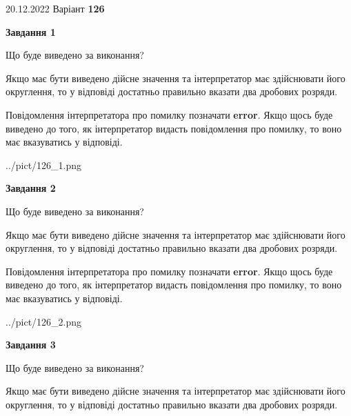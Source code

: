 \documentclass[12pt, ukrainian]{article}
\begin{document}
{20.12.2022 Варіант \No \textbf { 126 }\par}
{
\begin {Large}

{\begin {center}\textbf{Завдання 1}\end {center}}\par
Що буде виведено за виконання? \par

Якщо має бути виведено дійсне значення та інтерпретатор має здійснювати його округлення, 
то у відповіді достатньо правильно вказати два дробових розряди.

Повідомлення інтерпретатора про помилку позначати \textbf{error}.
Якщо щось буде виведено до того, як інтерпретатор видасть повідомлення про помилку, 
то воно має вказуватись у відповіді. \par

\begin{center}
	{../pict/126_1.png}
\end{center}
\newpage

{\begin {center}\textbf{Завдання 2}\end {center}}\par
Що буде виведено за виконання? \par

Якщо має бути виведено дійсне значення та інтерпретатор має здійснювати його округлення, 
то у відповіді достатньо правильно вказати два дробових розряди.

Повідомлення інтерпретатора про помилку позначати \textbf{error}.
Якщо щось буде виведено до того, як інтерпретатор видасть повідомлення про помилку, 
то воно має вказуватись у відповіді. \par

\begin{center}
	{../pict/126_2.png}
\end{center}
\newpage

{\begin {center}\textbf{Завдання 3}\end {center}}\par
Що буде виведено за виконання? \par

Якщо має бути виведено дійсне значення та інтерпретатор має здійснювати його округлення, 
то у відповіді достатньо правильно вказати два дробових розряди.


\end{Large}}
\end{document}
